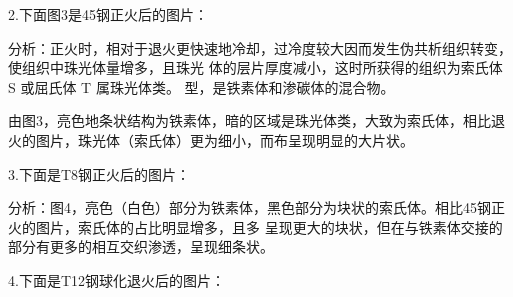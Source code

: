 \documentclass[a4paper,utf8]{article}
\begin{document}
\newpage

2.下面图3是45钢正火后的图片：

\begin{figure}[!ht]
    \begin{floatrow}
    \end{floatrow}

\end{figure}

分析：正火时，相对于退火更快速地冷却，过冷度较大因而发生伪共析组织转变，使组织中珠光体量增多，且珠光
体的层片厚度减小，这时所获得的组织为索氏体 S 或屈氏体 T 属珠光体类。
型，是铁素体和渗碳体的混合物。

由图3，亮色地条状结构为铁素体，暗的区域是珠光体类，大致为索氏体，相比退火的图片，珠光体（索氏体）更为细小，而布呈现明显的大片状。

3.下面是T8钢正火后的图片：

\begin{figure}[!ht]
    \begin{floatrow}
    \end{floatrow}

\end{figure}

分析：图4，亮色（白色）部分为铁素体，黑色部分为块状的索氏体。相比45钢正火的图片，索氏体的占比明显增多，且多
呈现更大的块状，但在与铁素体交接的部分有更多的相互交织渗透，呈现细条状。

4.下面是T12钢球化退火后的图片：
\end{document}
